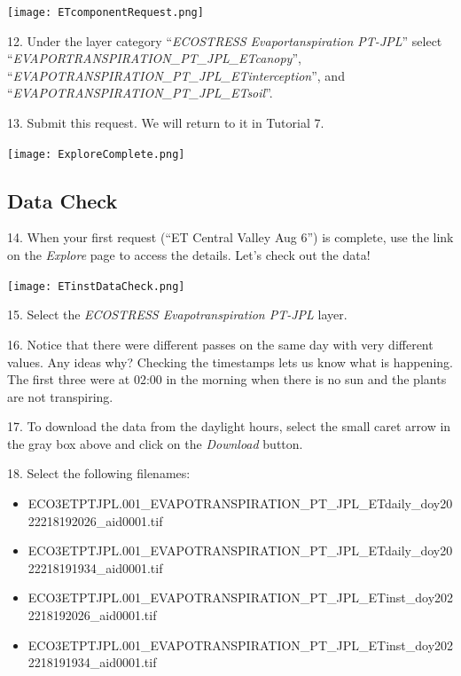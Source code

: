 \documentclass[oneside,a4paper,11pt,explicit]{book}
\begin{document}
\vspace{.5em}

\centerline{\texttt{[image: ETcomponentRequest.png]}}

\vspace{.5em}

12. Under the layer category ``\textit{ECOSTRESS Evaportanspiration PT-JPL}'' select ``\textit{EVAPORTRANSPIRATION\_PT\_JPL\_ETcanopy}'', ``\textit{EVAPOTRANSPIRATION\_PT\_JPL\_ETinterception}'', and ``\textit{EVAPOTRANSPIRATION\_PT\_JPL\_ETsoil}''.

13. Submit this request. We will return to it in Tutorial 7.

\vspace{.5em}

\centerline{\texttt{[image: ExploreComplete.png]}}

\vspace{.5em}

\subsection{Data Check}

14. When your first request (``ET Central Valley Aug 6'') is complete, use the link on the \textit{Explore} page to access the details. Let's check out the data!

\vspace{.5em}

\centerline{\texttt{[image: ETinstDataCheck.png]}}

\vspace{.5em}

15. Select the \textit{ECOSTRESS Evapotranspiration PT-JPL} layer.

16. Notice that there were different passes on the same day with very different values. Any ideas why? Checking the timestamps lets us know what is happening. The first three were at 02:00 in the morning when there is no sun and the plants are not transpiring.

17. To download the data from the daylight hours, select the small caret arrow in the gray box above and click on the \textit{Download} button.

18. Select the following filenames:

\begin{itemize}
	\item ECO3ETPTJPL.001\_EVAPOTRANSPIRATION\_PT\_JPL\_ETdaily\_doy2022218192026\_aid0001.tif
	\item ECO3ETPTJPL.001\_EVAPOTRANSPIRATION\_PT\_JPL\_ETdaily\_doy2022218191934\_aid0001.tif
	\item ECO3ETPTJPL.001\_EVAPOTRANSPIRATION\_PT\_JPL\_ETinst\_doy2022218192026\_aid0001.tif
	\item ECO3ETPTJPL.001\_EVAPOTRANSPIRATION\_PT\_JPL\_ETinst\_doy2022218191934\_aid0001.tif
\end{itemize}
\end{document}
